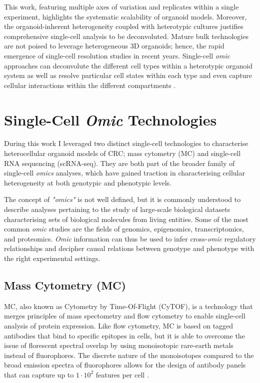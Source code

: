 This work, featuring multiple axes of variation and replicates within a single experiment, highlights the systematic scalability of organoid models. Moreover, the organoid-inherent heterogeneity coupled with heterotypic cultures justifies comprehensive single-cell analysis to be deconvoluted.
Mature bulk technologies are not poised to leverage heterogeneous 3D organoids; hence, the rapid emergence of single-cell resolution studies in recent years. Single-cell \emph{omic} approaches can deconvolute the different cell types within a heterotypic organoid system as well as resolve particular cell states within each type and even capture cellular interactions within the different compartments \cite{tape_heterocellular_2017}.

\newpage
\section{Single-Cell \emph{Omic} Technologies}

During this work I leveraged two distinct single-cell technologies to characterise heterocellular organoid models of CRC; mass cytometry (MC) and single-cell RNA sequencing (scRNA-seq). They are both part of the broader family of single-cell \emph{omics} analyses, which have gained traction in characterising cellular heterogeneity at both genotypic and phenotypic levels. 

The concept of \emph{"omics"} is not well defined, but it is commonly understood to describe analyses pertaining to the study of large-scale biological datasets characterising sets of biological molecules from living entities. Some of the most common \emph{omic} studies are the fields of genomics, epigenomics, transcriptomics, and proteomics.
\emph{Omic} information can thus be used to infer cross-\emph{omic} regulatory relationships and decipher causal relations between genotype and phenotype with the right experimental settings.


\subsection{Mass Cytometry (MC)}

MC, also known as Cytometry by Time-Of-Flight (CyTOF), is a technology that merges principles of mass spectometry and flow cytometry to enable single-cell analysis of protein expression. Like flow cytometry, MC is based on tagged antibodies that bind to specific epitopes in cells, but it is able to overcome the issue of florescent spectral overlap by using monoisotopic rare-earth metals instead of fluorophores. The discrete nature of the monoisotopes compared to the broad emission spectra of fluorophores allows for the design of antibody panels that can capture up to \(1\cdot10^2\) features per cell \cite{tracey_cytof_2021}. 

